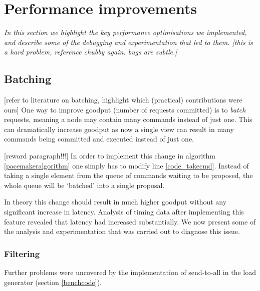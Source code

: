 \section{Performance improvements} \label{performance}

\textit{In this section we highlight the key performance optimisations we implemented, and describe some of the debugging and experimentation that led to them. [this is a hard problem, reference chubby again. bugs are subtle.] \cite{chubby}}


\subsection{Batching} \label{batching}
[refer to literature on batching, highlight which (practical) contributions were ours]
One way to improve goodput (number of requests committed) is to \textit{batch} requests, meaning a node may contain many commands instead of just one. This can dramatically increase goodput as now a single view can result in many commands being committed and executed instead of just one.

[reword paragraph!!!]
In order to implement this change in algorithm \ref{pacemakeralgorithm} one simply has to modify line \ref{code_takecmd}. Instead of taking a single element from the queue of commands waiting to be proposed, the whole queue will be `batched' into a single proposal.

In theory this change should result in much higher goodput without any significant increase in latency. Analysis of timing data after implementing this feature revealed that latency had increased substantially. We now present some of the analysis and experimentation that was carried out to diagnose this issue.

\subsubsection{Filtering} \label{filtering}
Further problems were uncovered by the implementation of send-to-all in the load generator (section \ref{benchcode}). 


